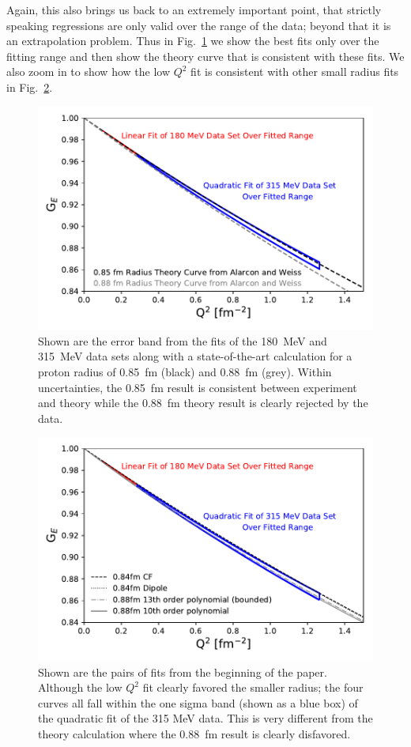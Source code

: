 \documentclass[10pt,superscriptaddress,aps,prc,twocolumn]{revtex4-1}
\begin{document}
Again, this also brings us back to an extremely important point, that strictly speaking regressions are only 
valid over the range of the data; beyond that it is an extrapolation problem.
Thus in Fig.~\ref{FitsAndTheory} we show the best fits only over the fitting range and then show the theory
curve that is consistent with these fits.   We also zoom in to show how the low $Q^2$ fit is consistent with
other small radius fits in Fig.~\ref{FitsAndOtherFits}.

\begin{figure}[htb]
\includegraphics[width=\columnwidth]{Figure/FitsAndTheory.pdf}
\caption{Shown are the error band from the fits of the 180~MeV and 315~MeV data sets along with a state-of-the-art
calculation for a proton radius of 0.85~fm (black) and 0.88~fm (grey).   Within uncertainties, the 0.85~fm result is
consistent between experiment and theory while the 0.88~fm theory result is clearly rejected by the data.}
\label{FitsAndTheory}
\end{figure}

\begin{figure}[htb]
\includegraphics[width=\columnwidth]{Figure/FitsAndFits.pdf}
\caption{Shown are the pairs of fits from the beginning of the paper.   Although the
low $Q^2$ fit clearly favored the smaller radius; the four curves all fall within the one sigma band (shown as a blue box) 
of the quadratic fit of the 315 MeV data.   This is very different from the theory calculation where the 0.88~fm result
is clearly disfavored.}
\label{FitsAndOtherFits}
\end{figure}
\end{document}
